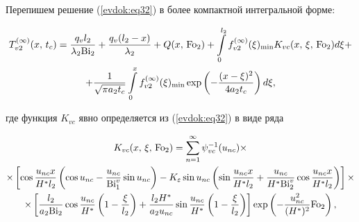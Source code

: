 Перепишем решение (\ref{evdok:eq32}) в более компактной интегральной форме:



\begin{multline}

\label{evdok:eq35}

 T_{v2}^{(\infty )} (x,\,t_c ) = \frac{q_v l_2 }{\lambda _2 {\rm Bi}_2 } + \frac{q_v 

(l_2 - x)}{\lambda _2 } + 

Q(x,\, {\rm Fo}_2)

+

\int\limits_0^{l_2 } f_{v2}^{(\infty )} (\xi )_{\min } 

K_{vc}(x,\,\xi,\,{\rm Fo}_2 )d\xi + \\ 

 + \frac{1}{\sqrt {\pi a_2 t_c } }\int\limits_0^x 

{f_{v2}^{(\infty )} (\xi )_{\min } } \exp \left( { - \frac{(x - \xi )^2}{4a_2 t_c }} \right)d\xi, 

\end{multline}

где функция $K_{vc}$ явно определяется из (\ref{evdok:eq32}) в виде ряда



\begin{multline*}

K_{vc}(x,\,\xi,\, {\rm Fo}_2)=

\sum\limits_{n = 1}^\infty \psi _{vc}^{-1} (u_{nc})\times

\\

\times 

\left[

\cos \frac{u_{nc}x}{H^*l_2}

\left( {\cos u_{nc} - \frac{u_{nc} }{{\rm Bi}_1^v }\sin u_{nc} } 

\right) 

-

K_\varepsilon \sin u_{nc}

\left( \sin \frac{u_{nc} x}{H^\ast l_2 } +\frac{u_{nc} }{H^\ast {\rm Bi}_2^v 

}\cos \frac{u_{nc} x}{H^\ast l_2 } \right)\right]\times

\\

\times 

\left[ \frac{l_2 }{a_2 {\rm Bi}_2 }\cos \frac{u_{nc} }{H^\ast }\left( {1 - 

\frac{\xi }{l_2 }} \right) + \frac{l_2 H^\ast }{a_2 u_{nc} }\sin 

\frac{u_{nc} }{H^\ast }\left( {1 - \frac{\xi }{l_2 }} \right) \right]

\exp \left( { - \frac{u_{nc}^2 }{(H^\ast )^2}{\rm Fo}_2 } \right),

\end{multline*}

